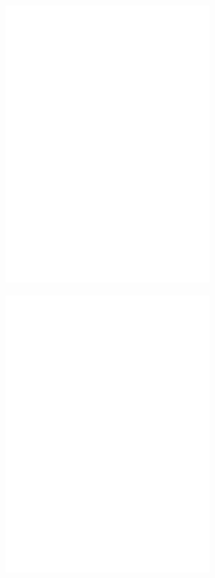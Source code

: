 \begin{figure}
	\centering
	\includegraphics[width=3in]{figures/shapes/blank.png}
\end{figure}
\begin{figure}
	\centering
	\includegraphics[width=3in]{figures/shapes/blank.png}
\end{figure}
